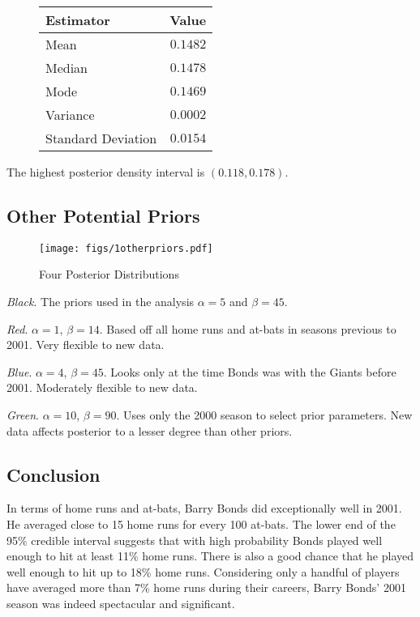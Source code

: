 \documentclass[12pt]{article}
\begin{document}
\begin{figure}[H]
\begin{center}
\begin{tabular}{l|r}
Estimator & \multicolumn{1}{l}{Value} \\ \hline \hline
Mean               & $0.1482$ \\
Median             & $0.1478$ \\
Mode               & $0.1469$ \\
Variance           & $0.0002$ \\
Standard Deviation & $0.0154$ \\
\end{tabular}
\end{center}
\end{figure}

\noindent The highest posterior density interval is $(0.118, 0.178)$.

\subsection{Other Potential Priors}


\begin{figure}[H]
\begin{center}
\texttt{[image: figs/1otherpriors.pdf]}
\caption{Four Posterior Distributions}
\end{center}
\end{figure}

\noindent \textit{Black}.  The priors used in the analysis $\alpha=5$ and $\beta=45$.

\noindent \textit{Red}. $\alpha=1$, $\beta=14$.  Based off all home runs and at-bats in seasons previous to 2001.  Very flexible to new data.

\noindent \textit{Blue}. $\alpha=4$, $\beta=45$.  Looks only at the time Bonds was with the Giants before 2001.  Moderately flexible to new data.

\noindent \textit{Green}. $\alpha=10$, $\beta=90$.  Uses only the 2000 season to select prior parameters.  New data affects posterior to a lesser degree than other priors.

\subsection{Conclusion}

In terms of home runs and at-bats, Barry Bonds did exceptionally well in 2001.  He averaged close to 15 home runs for every 100 at-bats.  The lower end of the 95\% credible interval suggests that with high probability Bonds played well enough to hit at least 11\% home runs.  There is also a good chance that he played well enough to hit up to 18\% home runs.  Considering only a handful of players have averaged more than 7\% home runs during their careers, Barry Bonds' 2001 season was indeed spectacular and significant.
\end{document}
